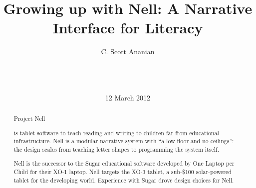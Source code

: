 \documentclass{acm_proc_article-sp}
\begin{document}
\title{Growing up with Nell: A Narrative Interface for Literacy}
%
%
%
%
%

\author{
%
%
\alignauthor
C. Scott Ananian\\
\\
\\
\\
}
\date{12 March 2012}

\maketitle

\begin{abstract}
Project Nell%

is tablet software to teach reading and writing to
children far from educational infrastructure.  Nell is a modular
narrative system with ``a low floor and no ceilings'': the design
scales from teaching letter shapes to programming the system itself.

Nell is the successor to the Sugar educational software developed by
One Laptop per Child for their XO-1 laptop.  Nell targets the XO-3
tablet, a sub-\$100 solar-powered tablet for the developing world.
Experience with Sugar drove design choices for Nell.
\end{abstract}
\end{document}
